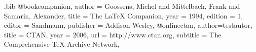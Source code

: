 \begin{filecontents}{\jobname.bib}
@book{companion,
  author       = {Goossens, Michel and Mittelbach, Frank and Samarin, Alexander},
  title        = {The LaTeX Companion},
  year         = 1994,
  edition      = 1,
  editor = {Sandmann},
  publisher    = {Addison-Wesley},
}
@online{ctan,
	author={testautor},
  title        = {CTAN},
  year         = 2006,
  url          = {http://www.ctan.org},
  subtitle     = {The Comprehensive TeX Archive Network},
}

\end{filecontents}


\documentclass{article}
\usepackage[utf8]{inputenc}
\usepackage[ngerman]{babel}
\usepackage[T1]{fontenc}
\usepackage{url}
\usepackage[numbers]{natbib}

\let\citeP\citep
\renewcommand\citep[1]{{\scshape\citeP{#1}}}
\bibpunct{(}{)}{;}{}{}{,}

\citep{companion}\par
\citep{ctan}


